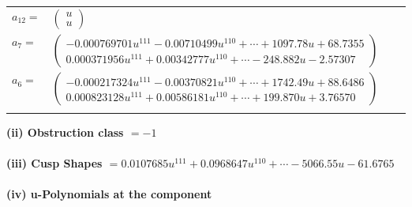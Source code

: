 \documentclass[1p]{elsarticle_modified}
\theoremstyle{definition}
\begin{document}
\begin{tabular}{m{7pt} m{180pt} m{7pt} m{180pt} }
\flushright $a_{12}=$&$\begin{pmatrix}u\\u\end{pmatrix}$ \\
\flushright $a_{7}=$&$\begin{pmatrix}-0.000769701 u^{111}-0.00710499 u^{110}+\cdots+1097.78 u+68.7355\\0.000371956 u^{111}+0.00342777 u^{110}+\cdots-248.882 u-2.57307\end{pmatrix}$ \\
\flushright $a_{6}=$&$\begin{pmatrix}-0.000217324 u^{111}-0.00370821 u^{110}+\cdots+1742.49 u+88.6486\\0.000823128 u^{111}+0.00586181 u^{110}+\cdots+199.870 u+3.76570\end{pmatrix}$\\&\end{tabular}
\flushleft \textbf{(ii) Obstruction class $= -1$}\\~\\
\flushleft \textbf{(iii) Cusp Shapes $= 0.0107685 u^{111}+0.0968647 u^{110}+\cdots-5066.55 u-61.6765$}\\~\\
\newpage\renewcommand{\arraystretch}{1}
\flushleft \textbf{(iv) u-Polynomials at the component}\newline \\
\end{document}
